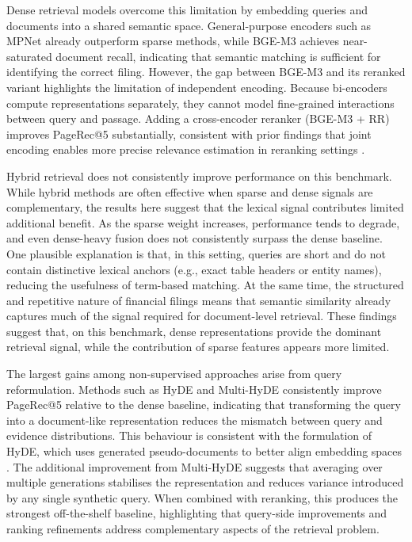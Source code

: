 \documentclass[12pt,twoside,maitrise]{dms}
\theoremstyle{definition}
\numberwithin{equation}{section}
\numberwithin{table}{chapter}
\numberwithin{figure}{chapter}
\begin{document}
Dense retrieval models overcome this limitation by embedding queries and documents into a shared semantic space. General-purpose encoders such as MPNet already outperform sparse methods, while BGE-M3 achieves near-saturated document recall, indicating that semantic matching is sufficient for identifying the correct filing. However, the gap between BGE-M3 and its reranked variant highlights the limitation of independent encoding. Because bi-encoders compute representations separately, they cannot model fine-grained interactions between query and passage. Adding a cross-encoder reranker (BGE-M3 + RR) improves PageRec@5 substantially, consistent with prior findings that joint encoding enables more precise
relevance estimation in reranking settings \citep{nogueira2019document}.

Hybrid retrieval does not consistently improve performance on this benchmark. While hybrid methods are often effective when sparse and dense signals are complementary, the results here suggest that the lexical signal contributes limited additional benefit. As the sparse weight increases, performance tends to degrade, and even dense-heavy fusion does not consistently surpass the dense baseline. One plausible explanation is that, in this setting, queries are short and do not contain distinctive lexical anchors (e.g., exact table headers or entity names), reducing the usefulness of term-based matching. At the same time, the structured and repetitive nature of financial filings means that semantic similarity already captures much of the signal required for document-level retrieval. These findings suggest that, on this benchmark, dense representations provide the dominant retrieval signal, while the contribution of sparse features appears more limited.


The largest gains among non-supervised approaches arise from query reformulation.
Methods such as HyDE and Multi-HyDE consistently improve PageRec@5 relative to the dense baseline, indicating that transforming the query into a document-like representation reduces the mismatch between query and evidence distributions. This behaviour is consistent with the formulation of HyDE, which uses generated pseudo-documents to better align embedding spaces \citep{gao2023precise}. The additional improvement from Multi-HyDE suggests that averaging over multiple generations stabilises the representation and reduces variance introduced by any single synthetic query. When combined with reranking, this produces the strongest off-the-shelf baseline, highlighting that query-side improvements and ranking refinements
address complementary aspects of the retrieval problem.
\end{document}
